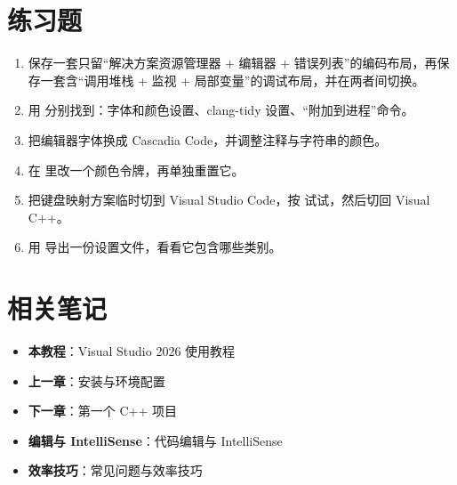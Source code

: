 \section{练习题}

\begin{enumerate}
	\item 保存一套只留“解决方案资源管理器 + 编辑器 + 错误列表”的编码布局，再保存一套含“调用堆栈 + 监视 + 局部变量”的调试布局，并在两者间切换。
	\item 用  分别找到：字体和颜色设置、clang-tidy 设置、“附加到进程”命令。
	\item 把编辑器字体换成 Cascadia Code，并调整注释与字符串的颜色。
	\item 在  里改一个颜色令牌，再单独重置它。
	\item 把键盘映射方案临时切到 Visual Studio Code，按  试试，然后切回 Visual C++。
	\item 用  导出一份设置文件，看看它包含哪些类别。
\end{enumerate}

\section{相关笔记}

\begin{itemize}
	\item \textbf{本教程}：Visual Studio 2026 使用教程
	\item \textbf{上一章}：安装与环境配置
	\item \textbf{下一章}：第一个 C++ 项目
	\item \textbf{编辑与 IntelliSense}：代码编辑与 IntelliSense
	\item \textbf{效率技巧}：常见问题与效率技巧
\end{itemize}
